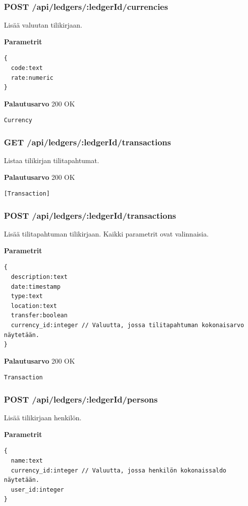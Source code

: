 \documentclass[a4paper,parskip=half]{scrartcl}
\begin{document}
\subsubsection{POST /api/ledgers/:ledgerId/currencies}

Lisää valuutan tilikirjaan.

\textbf{Parametrit}
\begin{Verbatim}
{
  code:text
  rate:numeric
}
\end{Verbatim}

\textbf{Palautusarvo}
200 OK
\begin{Verbatim}
Currency
\end{Verbatim}

\subsubsection{GET /api/ledgers/:ledgerId/transactions}

Listaa tilikirjan tilitapahtumat.

\textbf{Palautusarvo}
200 OK
\begin{Verbatim}
[Transaction]
\end{Verbatim}

\subsubsection{POST /api/ledgers/:ledgerId/transactions}

Lisää tilitapahtuman tilikirjaan. Kaikki parametrit ovat valinnaisia.

\textbf{Parametrit}
\begin{Verbatim}
{
  description:text
  date:timestamp
  type:text
  location:text
  transfer:boolean
  currency_id:integer // Valuutta, jossa tilitapahtuman kokonaisarvo näytetään.
}
\end{Verbatim}

\textbf{Palautusarvo}
200 OK
\begin{Verbatim}
Transaction
\end{Verbatim}

\subsubsection{POST /api/ledgers/:ledgerId/persons}

Lisää tilikirjaan henkilön.

\textbf{Parametrit}
\begin{Verbatim}
{
  name:text
  currency_id:integer // Valuutta, jossa henkilön kokonaissaldo näytetään.
  user_id:integer
}
\end{Verbatim}
\end{document}
